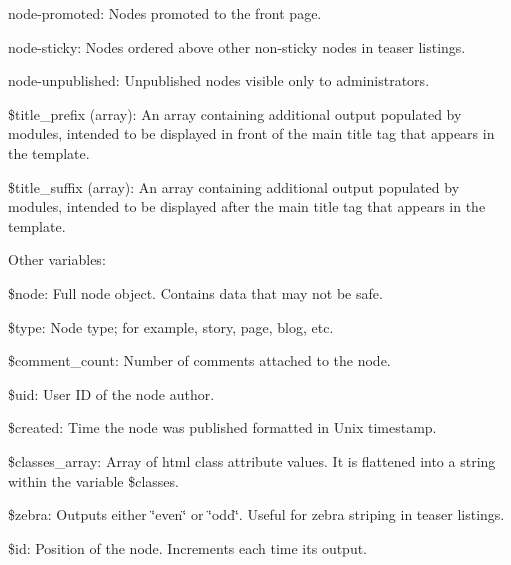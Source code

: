 \begin{DoxyItemize}
\begin{DoxyItemize}
\item node-\/promoted\+: Nodes promoted to the front page.
\item node-\/sticky\+: Nodes ordered above other non-\/sticky nodes in teaser listings.
\item node-\/unpublished\+: Unpublished nodes visible only to administrators.
\end{DoxyItemize}
\item \$title\+\_\+prefix (array)\+: An array containing additional output populated by modules, intended to be displayed in front of the main title tag that appears in the template.
\item \$title\+\_\+suffix (array)\+: An array containing additional output populated by modules, intended to be displayed after the main title tag that appears in the template.
\end{DoxyItemize}

Other variables\+:
\begin{DoxyItemize}
\item \$node\+: Full node object. Contains data that may not be safe.
\item \$type\+: Node type; for example, story, page, blog, etc.
\item \$comment\+\_\+count\+: Number of comments attached to the node.
\item \$uid\+: User ID of the node author.
\item \$created\+: Time the node was published formatted in Unix timestamp.
\item \$classes\+\_\+array\+: Array of html class attribute values. It is flattened into a string within the variable \$classes.
\item \$zebra\+: Outputs either \char`\"{}even\char`\"{} or \char`\"{}odd\char`\"{}. Useful for zebra striping in teaser listings.
\item \$id\+: Position of the node. Increments each time it\textquotesingle{}s output.
\end{DoxyItemize}

